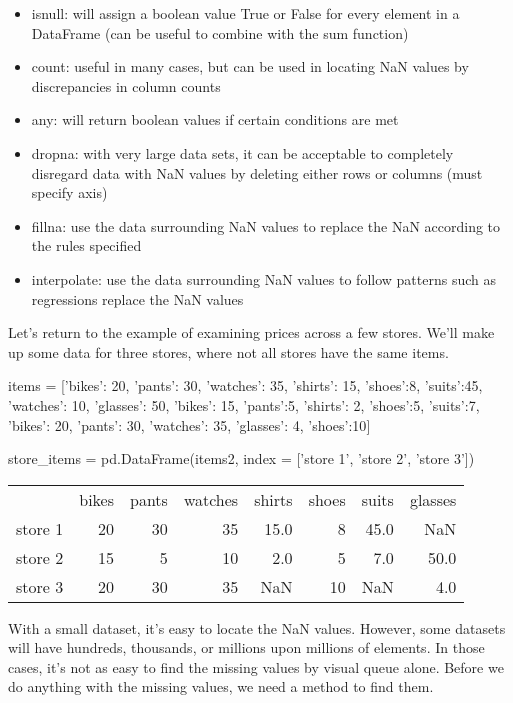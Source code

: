 \documentclass{article}
\begin{document}
\begin{itemize}
	\item isnull: will assign a boolean value True or False for every element in a DataFrame (can be useful to combine with the sum function)
	\item count: useful in many cases, but can be used in locating NaN values by discrepancies in column counts
	\item any: will return boolean values if certain conditions are met
	\item dropna: with very large data sets, it can be acceptable to completely disregard data with NaN values by deleting either rows or columns (must specify axis)
	\item fillna: use the data surrounding NaN values to replace the NaN according to the rules specified
	\item interpolate: use the data surrounding NaN values to follow patterns such as regressions replace the NaN values
\end{itemize}

Let's return to the example of examining prices across a few stores. We'll make up some data for three stores, where not all stores have the same items.

\begin{python}
	items = [{'bikes': 20, 'pants': 30, 'watches': 35, 'shirts': 15, 'shoes':8, 'suits':45},
	{'watches': 10, 'glasses': 50, 'bikes': 15, 'pants':5, 'shirts': 2, 'shoes':5, 'suits':7},
	{'bikes': 20, 'pants': 30, 'watches': 35, 'glasses': 4, 'shoes':10}]
	
	store_items = pd.DataFrame(items2, index = ['store 1', 'store 2', 'store 3'])
\end{python}

\begin{center}
	\begin{tabular}{lrrrrrrr}
		{} &  bikes &  pants &  watches &  shirts &  shoes &  suits &  glasses \\
		store 1 &     20 &     30 &       35 &    15.0 &      8 &   45.0 &      NaN \\
		store 2 &     15 &      5 &       10 &     2.0 &      5 &    7.0 &     50.0 \\
		store 3 &     20 &     30 &       35 &     NaN &     10 &    NaN &      4.0 \\
	\end{tabular}
\end{center}

With a small dataset, it's easy to locate the NaN values. However, some datasets will have hundreds, thousands, or millions upon millions of elements. In those cases, it's not as easy to find the missing values by visual queue alone. Before we do anything with the missing values, we need a method to find them.
\end{document}
